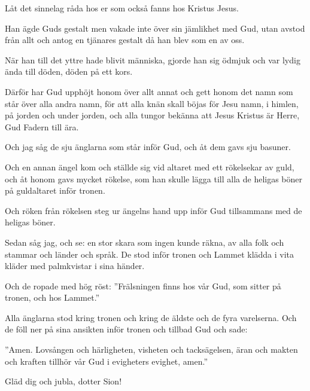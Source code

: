 {Låt det sinnelag råda hos er som också fanns hos Kristus Jesus. }

Han ägde Guds gestalt men vakade inte över sin jämlikhet med Gud, 
utan avstod från allt och antog en tjänares gestalt då han blev som en av oss. 

När han till det yttre hade blivit människa, gjorde han sig ödmjuk och var lydig ända till döden, döden på ett kors. 

Därför har Gud upphöjt honom över allt annat och gett honom det namn som står över alla andra namn, för att alla knän skall böjas för Jesu namn, i himlen, på jorden och under jorden, och alla tungor bekänna att Jesus Kristus är Herre, Gud Fadern till ära.



{
Och jag såg de sju änglarna som står inför Gud, och åt dem gavs sju basuner.}

Och en annan ängel kom och ställde sig vid altaret med ett rökelsekar av guld, och åt honom gavs mycket rökelse, som han skulle lägga till alla de heligas böner på guldaltaret inför tronen.

Och röken från rökelsen steg ur ängelns hand upp inför Gud tillsammans med de heligas böner.

{Sedan såg jag, och se: en stor skara som ingen kunde räkna, av alla folk och stammar och länder och språk. De stod inför tronen och Lammet klädda i vita kläder med palmkvistar i sina händer.}

Och de ropade med hög röst: ''Frälsningen finns hos vår Gud, som sitter på tronen, och hos Lammet.''

Alla änglarna stod kring tronen och kring de äldste och de fyra varelserna. Och de föll ner på sina ansikten inför tronen och tillbad Gud
och sade: 

''Amen. Lovsången och härligheten, visheten och tacksägelsen, äran och makten och kraften tillhör vår Gud i evigheters evighet, amen.''



{
Gläd dig och jubla, dotter Sion!}


